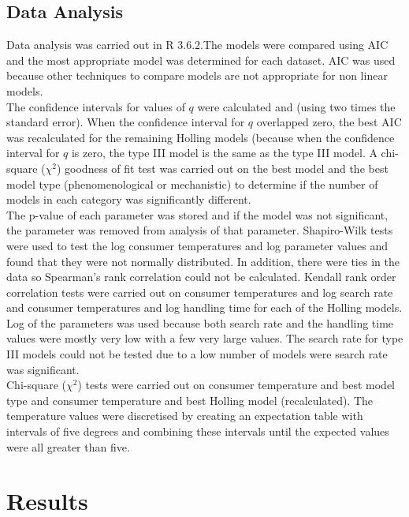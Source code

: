 \documentclass{article}
\begin{document}
\subsection{Data Analysis}
Data analysis was carried out in R 3.6.2\cite{RCoreTeam2017}.The models were compared using AIC and the most appropriate model was determined for each dataset. AIC was used because other techniques to compare models are not appropriate for non linear models.\\  %
The confidence intervals for values of $q$ were calculated and (using two times the standard error). When the confidence interval for $q$ overlapped zero, the best AIC was recalculated for the remaining Holling models (because when the confidence interval for $q$ is zero, the type III model is the same as the type III model.  %
A chi-square ($\chi^2$) goodness of fit test was carried out on the best model and the best model type (phenomenological or mechanistic) to determine if the number of models in each category was significantly different.\\
The p-value of each parameter was stored and if the model was not significant, the parameter was removed from analysis of that parameter. Shapiro-Wilk tests were used to test the log consumer temperatures and log parameter values and found that they were not normally distributed. In addition, there were ties in the data so Spearman's rank correlation could not be calculated.  Kendall rank order correlation tests were carried out on consumer temperatures and log search rate and consumer temperatures and log handling time for each of the Holling models. Log of the parameters was used because both search rate and the handling time values were mostly very low with  a few very large values. The search rate for type III models could not be tested due to a low number of models were search rate was significant. \\ 
Chi-square ($\chi^2$) tests were carried out on consumer temperature and best model type and consumer temperature and best Holling model (recalculated). The temperature values were discretised by creating an expectation table with intervals of five degrees and combining these intervals until the expected values were all greater than five.
\section{Results}
\end{document}
